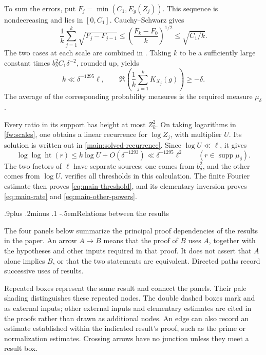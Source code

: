 \documentclass[twoside]{aomart}
\makeatletter
\theoremstyle{paperplain}
\theoremstyle{paperdefinition}
\renewcommand\subsection{\@startsection{subsection}{2}{\z@}
  {.9\baselineskip plus .2\baselineskip minus .1\baselineskip}
  {-.5em}{\normalfont\bfseries}}
\numberwithin{equation}{section}
\makeatother
\begin{document}
To sum the errors, put $F_j=\min(C_1,E_g(Z_j))$. This sequence
is nondecreasing and lies in $[0,C_1]$. Cauchy--Schwarz gives
\begin{equation*}
 \frac1k\sum_{j=1}^k\sqrt{F_j-F_{j-1}}
 \le\left(\frac{F_k-F_0}{k}\right)^{1/2}
 \le\sqrt{C_1/k}.
\end{equation*}
The two cases at each scale are combined in
. Taking $k$ to be a sufficiently large
constant times $b_\delta^2C_1\delta^{-2}$, rounded up, yields
\begin{equation*}
 k\ll\delta^{-1295}\ell,
 \qquad
 \Re\left(\frac1k\sum_{j=1}^kK_{X_j}(g)\right)\ge-\delta.
\end{equation*}
The average of the corresponding probability measures is the
required measure $\mu_\delta$.

Every ratio in its support has height at most $Z_k^2$. On taking
logarithms in \eqref{fw:scales}, one obtains a linear recurrence
for $\log Z_j$, with multiplier $U$. Its solution is written out
in \eqref{main:solved-recurrence}. Since
$\log U\ll\ell$, it gives
\begin{equation*}
 \log\log\operatorname{ht}(r)
 \le k\log U+O(\delta^{-1293})
 \ll\delta^{-1295}\ell^2
 \qquad(r\in\operatorname{supp}\mu_\delta).
\end{equation*}
The two factors of $\ell$ have separate sources: one comes from
$b_\delta^2$, and the other comes from $\log U$.
 verifies all thresholds in this
calculation. The finite Fourier estimate then proves
\eqref{eq:main-threshold}, and its elementary inversion proves
\eqref{eq:main-rate} and \eqref{eq:main-other-powers}.

\subsection{Relations between the results}
\label{framework:result-graph}

The four panels below summarize the principal proof dependencies of the
results in the paper. An arrow \(A\to B\) means that the proof of \(B\)
uses \(A\), together with the hypotheses and other inputs required in
that proof. It does not assert that \(A\) alone implies \(B\), or that
the two statements are equivalent. Directed paths record successive
uses of results.

Repeated boxes represent the same result and connect the panels.
Their pale shading distinguishes these repeated nodes. The double
dashed boxes mark  and  as external inputs; other external inputs
and elementary estimates are cited in the proofs rather than drawn
as additional nodes. An edge can also record an estimate established
within the indicated result's proof, such as the prime or
normalization estimates. Crossing arrows have no junction unless
they meet a result box.
\end{document}
